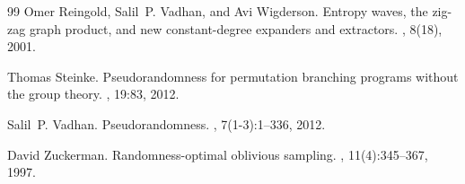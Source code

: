 \documentclass[10pt,a4paper]{article}
\begin{document}
\begin{thebibliography}{99}
Omer Reingold, Salil~P. Vadhan, and Avi Wigderson.
\newblock Entropy waves, the zig-zag graph product, and new constant-degree
  expanders and extractors.
,
  8(18), 2001.

Thomas Steinke.
\newblock Pseudorandomness for permutation branching programs without the group
  theory.
,
  19:83, 2012.

Salil~P. Vadhan.
\newblock Pseudorandomness.
,
  7(1-3):1--336, 2012.

David Zuckerman.
\newblock Randomness-optimal oblivious sampling.
, 11(4):345--367, 1997.

\end{thebibliography}
\end{document}
